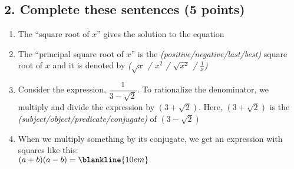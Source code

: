 \documentclass{hw}
\begin{document}
\newpage
\subsection*{\normalsize 2. Complete these sentences (5 points)}
\begin{enumerate}[label=\alph*.]
    \setlength{\itemsep}{2em} %
    \item The ``square root of $x$'' gives the solution to the equation \blankline{6em}
    \item The ``principal square root of $x$'' is the \blankline{6em} \textit{(positive/negative/last/best)} square root of $x$
        and it is denoted by \blankline{6em} \textit{($\sqrt{x}$ / $x^2$ / $\sqrt{x^2}$ / $\frac{1}{x}$)}
    \item Consider the expression, $\dfrac{1}{3-\sqrt{2}}$. To rationalize the denominator, we multiply and divide the expression by
        $(3+\sqrt{2})$. Here, $(3+\sqrt{2})$ is the \blankline{12em} \textit{(subject/object/predicate/conjugate)} of $(3-\sqrt{2})$
    \item When we multiply something by its conjugate, we get an expression with squares like this:\\
        $(a+b)(a-b) = \blankline{10em}$
\end{enumerate}
\end{document}
